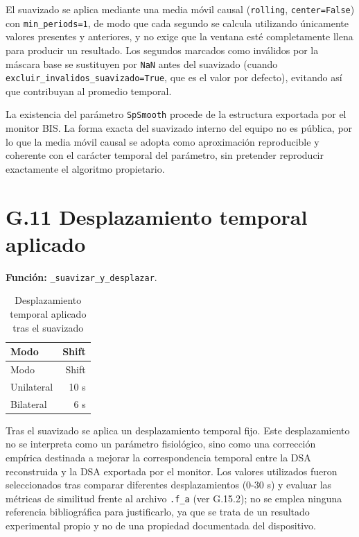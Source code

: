 \documentclass[
  spanish,
  a4paper,
  12pt,
  twoside]{memoir}
\begin{document}
El suavizado se aplica mediante una media móvil causal
(\texttt{rolling}, \texttt{center=False}) con \texttt{min\_periods=1},
de modo que cada segundo se calcula utilizando únicamente valores
presentes y anteriores, y no exige que la ventana esté completamente
llena para producir un resultado. Los segundos marcados como inválidos
por la máscara base se sustituyen por \texttt{NaN} antes del suavizado
(cuando \texttt{excluir\_invalidos\_suavizado=True}, que es el valor por
defecto), evitando así que contribuyan al promedio temporal.

La existencia del parámetro \texttt{SpSmooth} procede de la estructura
exportada por el monitor BIS. La forma exacta del suavizado interno del
equipo no es pública, por lo que la media móvil causal se adopta como
aproximación reproducible y coherente con el carácter temporal del
parámetro, sin pretender reproducir exactamente el algoritmo
propietario.

\chapter{G.11 Desplazamiento temporal
aplicado}\label{g.11-desplazamiento-temporal-aplicado}

\textbf{Función:} \texttt{\_suavizar\_y\_desplazar}.

\begin{longtable}[]{@{}lr@{}}
\caption{Desplazamiento temporal aplicado tras el
suavizado}\label{tbl-shift-anexo}\tabularnewline
\toprule\noalign{}
Modo & Shift \\
\midrule\noalign{}
\endfirsthead
\toprule\noalign{}
Modo & Shift \\
\midrule\noalign{}
\endhead
\bottomrule\noalign{}
\endlastfoot
Unilateral & 10 s \\
Bilateral & 6 s \\
\end{longtable}

Tras el suavizado se aplica un desplazamiento temporal fijo. Este
desplazamiento no se interpreta como un parámetro fisiológico, sino como
una corrección empírica destinada a mejorar la correspondencia temporal
entre la DSA reconstruida y la DSA exportada por el monitor. Los valores
utilizados fueron seleccionados tras comparar diferentes desplazamientos
(0-30 s) y evaluar las métricas de similitud frente al archivo
\texttt{.f\_a} (ver G.15.2); no se emplea ninguna referencia
bibliográfica para justificarlo, ya que se trata de un resultado
experimental propio y no de una propiedad documentada del dispositivo.
\end{document}

